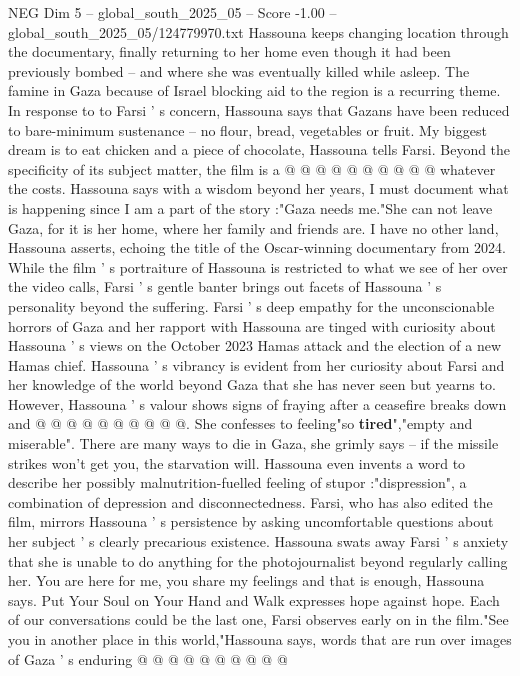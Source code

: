 \begin{textsample}{NEG Dim 5 – global\_south\_2025\_05 – Score -1.00 – global\_south\_2025\_05/124779970.txt}
Hassouna keeps changing location through the documentary, finally returning to her home even though it had been previously bombed -- and where she was eventually killed while asleep.
The famine in Gaza because of Israel blocking aid to the region is a recurring theme.
In response to to Farsi ' s concern, Hassouna says that Gazans have been reduced to bare-minimum sustenance -- no flour, bread, vegetables or fruit.
My biggest dream is to eat chicken and a piece of chocolate, Hassouna tells Farsi.
Beyond the specificity of its subject matter, the film is a @ @ @ @ @ @ @ @ @ @ whatever the costs.
Hassouna says with a wisdom beyond her years, I must document what is happening since I am a part of the story :"Gaza needs me."She can not leave Gaza, for it is her home, where her family and friends are.
I have no other land, Hassouna asserts, echoing the title of the Oscar-winning documentary from 2024.
While the film ' s portraiture of Hassouna is restricted to what we see of her over the video calls, Farsi ' s gentle banter brings out facets of Hassouna ' s personality beyond the suffering.
Farsi ' s deep empathy for the unconscionable horrors of Gaza and her rapport with Hassouna are tinged with curiosity about Hassouna ' s views on the October 2023 Hamas attack and the election of a new Hamas chief.
Hassouna ' s vibrancy is evident from her curiosity about Farsi and her knowledge of the world beyond Gaza that she has never seen but yearns to.
However, Hassouna ' s valour shows signs of fraying after a ceasefire breaks down and @ @ @ @ @ @ @ @ @ @.
She confesses to feeling"so \textbf{tired}","empty and miserable".
There are many ways to die in Gaza, she grimly says -- if the missile strikes won't get you, the starvation will.
Hassouna even invents a word to describe her possibly malnutrition-fuelled feeling of stupor :"dispression", a combination of depression and disconnectedness.
Farsi, who has also edited the film, mirrors Hassouna ' s persistence by asking uncomfortable questions about her subject ' s clearly precarious existence.
Hassouna swats away Farsi ' s anxiety that she is unable to do anything for the photojournalist beyond regularly calling her.
You are here for me, you share my feelings and that is enough, Hassouna says.
Put Your Soul on Your Hand and Walk expresses hope against hope.
Each of our conversations could be the last one, Farsi observes early on in the film."See you in another place in this world,"Hassouna says, words that are run over images of Gaza ' s enduring @ @ @ @ @ @ @ @ @ @

\end{textsample}
